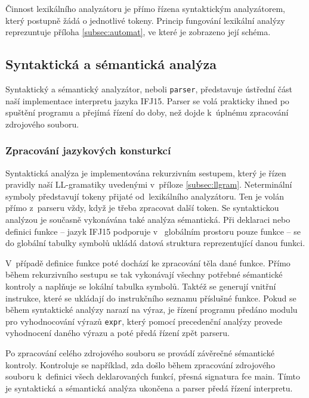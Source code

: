 \documentclass[a4paper, 12pt]{article}
\begin{document}
Činnost lexikálního analyzátoru je přímo řízena syntaktickým analyzátorem, který
postupně žádá o jednotlivé tokeny. Princip fungování lexikální analýzy
reprezuntuje příloha \ref{subsec:automat}, ve které je zobrazeno její schéma.

\subsection{Syntaktická a sémantická analýza} \label{parser}

Syntaktický a sémantický analyzátor, neboli \texttt{parser}, představuje ústřední
část naší implementace interpretu jazyka IFJ15. Parser se volá prakticky ihned po
spuštění programu a přejímá řízení do doby, než dojde k~úplnému zpracování
zdrojového souboru.

\subsubsection{Zpracování jazykových konsturkcí}
Syntaktická analýza je implementována rekurzivním sestupem, který je řízen
pravidly naší LL-gramatiky uvedenými v~příloze \ref{subsec:llgram}.
Neterminální symboly představují tokeny přijaté od~lexikálního analyzátoru.
Ten je volán přímo z~parseru vždy, když je třeba
zpracovat další token. Se syntaktickou analýzou je současně vykonávána také
analýza sémantická. Při deklaraci nebo definici funkce -- jazyk IFJ15 podporuje v~
globálním prostoru pouze funkce -- se do globální tabulky symbolů ukládá datová
struktura reprezentující danou funkci.

V~případě definice funkce poté dochází ke zpracování těla dané funkce.
Přímo během rekurzivního sestupu se tak vykonávají všechny potřebné
sémantické kontroly a naplňuje se lokální tabulka symbolů. Taktéž se generují
vnitřní instrukce, které se ukládají do instrukčního seznamu příslušné funkce.
Pokud se během syntaktické analýzy narazí na výraz, je řízení programu předáno
modulu pro vyhodnocování výrazů \texttt{expr}, který pomocí precedenční analýzy
provede vyhodnocení daného výrazu a poté předá řízení zpět parseru.

Po zpracování celého zdrojového souboru se provádí závěrečné sémantické
kontroly. Kontroluje se například, zda došlo během zpracování zdrojového
souboru k~definici všech deklarovaných funkcí, přesná signatura fce main.
Tímto je syntaktická a sémantická analýza ukončena a parser předá řízení interpretu.
\end{document}
